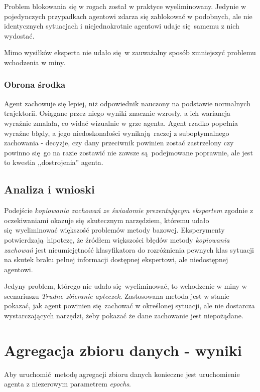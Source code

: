 \documentclass[polish,master,a4paper,oneside]{ppfcmthesis}
\begin{document}
Problem blokowania się w rogach został w praktyce wyeliminowany. Jedynie w pojedynczych przypadkach agentowi zdarza się zablokować w podobnych, ale nie identycznych sytuacjach i niejednokrotnie agentowi udaje się samemu z nich wydostać.

Mimo wysiłków eksperta nie udało się w zauważalny sposób zmniejszyć problemu wchodzenia w miny.

\subsubsection{Obrona środka}
Agent zachowuje się lepiej, niż odpowiednik nauczony na podstawie normalnych trajektorii.
Osiągane przez niego wyniki znacznie wzrosły, a ich wariancja wyraźnie zmalała, co widać wizualnie w grze agenta. Agent rzadko popełnia wyraźne błędy, a jego niedoskonałości wynikają raczej z suboptymalnego zachowania - decyzje, czy dany przeciwnik powinien zostać zastrzelony czy powinno się go na razie zostawić nie zawsze są podejmowane poprawnie, ale jest to kwestia ,,dostrojenia'' agenta.

\subsection{Analiza i wnioski}

Podejście \textit{kopiowania zachowań ze świadomie prezentującym ekspertem} zgodnie z oczekiwaniami okazuje się skutecznym narzędziem, któremu udało się wyeliminować większość problemów metody bazowej. Eksperymenty potwierdzają hipotezę, że źródłem większości błędów metody \textit{kopiowania zachowań} jest nieumiejętność klasyfikatora do rozróżnienia pewnych klas sytuacji na skutek braku pełnej informacji dostępnej ekspertowi, ale niedostępnej agentowi.

Jedyny problem, którego nie udało się wyeliminować, to wchodzenie w miny w scenariuszu \textit{Trudne zbieranie apteczek}. Zastosowana metoda jest w stanie pokazać, jak agent powinien się zachować w określonej sytuacji, ale nie dostarcza wystarczających narzędzi, żeby pokazać że dane zachowanie jest niepożądane.



 \section{Agregacja zbioru danych - wyniki}

Aby uruchomić metodę agregacji zbioru danych konieczne jest uruchomienie agenta z niezerowym parametrem \textit{epochs}.
\end{document}
